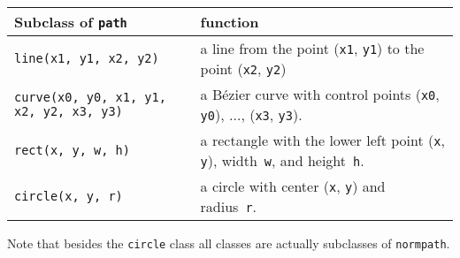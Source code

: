 \medskip
\begin{tabularx}{\linewidth}{l>{\raggedright\arraybackslash}X}
Subclass of \texttt{path} & function \\
\hline
\texttt{line(x1, y1, x2, y2)} & a line from the point
  (\texttt{x1}, \texttt{y1}) to the point (\texttt{x2}, \texttt{y2})\\
\texttt{curve(x0, y0, x1, y1, x2, y2, x3, y3)} & a B\'ezier curve with 
control points  (\texttt{x0}, \texttt{y0}), $\dots$, (\texttt{x3}, \texttt{y3}).\\
\texttt{rect(x, y, w, h)} &  a rectangle with the
  lower left point (\texttt{x}, \texttt{y}), width~\texttt{w}, and
  height~\texttt{h}. \\
\texttt{circle(x, y, r)} & a circle with 
  center (\texttt{x}, \texttt{y}) and radius~\texttt{r}.
\end{tabularx}
\medskip
Note that besides the \verb|circle| class all classes are actually
subclasses of \verb|normpath|.





